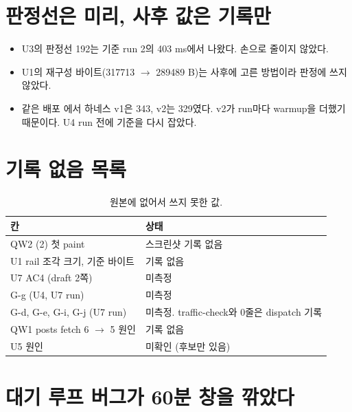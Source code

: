\section{판정선은 미리, 사후 값은 기록만}\label{sec:le-prereg}

\begin{itemize}[nosep]
  \item U3의 판정선 192는 기준 run 2의 403 ms에서 나왔다. 손으로 줄이지 않았다.
  \item U1의 재구성 바이트(317713 $\to$ 289489 B)는 사후에 고른 방법이라 판정에 쓰지 않았다.
  \item 같은 배포 에서 하네스 v1은 343, v2는 329였다. v2가 run마다 warmup을 더했기 때문이다. U4 run 전에 기준을 다시 잡았다.
\end{itemize}

\section{기록 없음 목록}\label{sec:le-missing}

\begin{table}[H]
  \caption{원본에 없어서 쓰지 못한 값.}
  \label{tab:le-missing}
  \centering\small
  \begin{tabularx}{\linewidth}{@{}L{4.4cm} Y@{}}
    \toprule
    칸 & 상태 \\
    \midrule
    QW2 (2) 첫 paint & 스크린샷 기록 없음 \\
    \midrule
    U1 rail 조각 크기, 기준 바이트 & 기록 없음 \\
    \midrule
    U7 AC4 (draft 2쪽) & 미측정 \\
    \midrule
    G-g (U4, U7 run) & 미측정 \\
    \midrule
    G-d, G-e, G-i, G-j (U7 run) & 미측정. traffic-check와  0줄은 dispatch 기록 \\
    \midrule
    QW1 posts fetch 6 $\to$ 5 원인 & 기록 없음 \\
    \midrule
    U5  원인 & 미확인 (후보만 있음) \\
    \bottomrule
  \end{tabularx}
\end{table}

\section{대기 루프 버그가 60분 창을 깎았다}\label{sec:le-wait}

